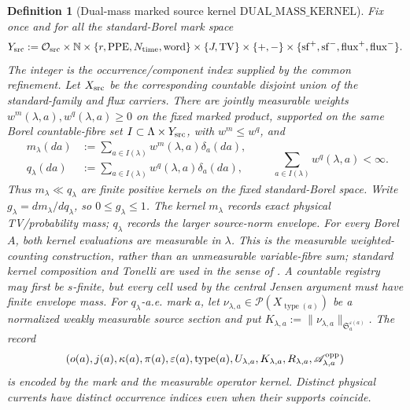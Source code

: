 \documentclass[11pt]{article}
\newtheorem{definition}[theorem]{Definition}
\begin{document}
\begin{definition}[Dual-mass marked source kernel
$\mathrm{DUAL\_MASS\_KERNEL}$]
\label{def:source-incidence-space}
Fix once and for all the standard-Borel mark space
\[
 Y_{\rm src}:=\mathcal O_{\rm src}\times\mathbb N\times
 \{r,\mathrm{PPE},N_{\rm time},\mathrm{word}\}\times
 \{J,\mathrm{TV}\}\times\{+,-\}\times
 \{\mathrm{sf}^+,\mathrm{sf}^-,\mathrm{flux}^+,\mathrm{flux}^-\}.
\]
The integer is the occurrence/component index supplied by the common
refinement.  Let $X_{\rm src}$ be the corresponding countable disjoint union
of the standard-family and flux carriers.  There are jointly measurable
weights $w^m(\lambda,a),w^q(\lambda,a)\ge0$ on the fixed marked product,
supported on the same Borel countable-fibre set
$I\subset\Lambda\times Y_{\rm src}$, with $w^m\le w^q$, and
\begin{equation}
\label{eq:marked-weighted-counting-kernel}
 \begin{aligned}
 m_\lambda(da)&:=\sum_{a\in I(\lambda)}w^m(\lambda,a)\delta_a(da),\\
 q_\lambda(da)&:=\sum_{a\in I(\lambda)}w^q(\lambda,a)\delta_a(da),
 \end{aligned}
 \qquad
 \sum_{a\in I(\lambda)}w^q(\lambda,a)<\infty.
\end{equation}
Thus $m_\lambda\ll q_\lambda$ are finite positive kernels on the fixed
standard-Borel space.  Write $g_\lambda=dm_\lambda/dq_\lambda$, so
$0\le g_\lambda\le1$.  The kernel $m_\lambda$ records exact physical
TV/probability mass; $q_\lambda$ records the larger source-norm envelope.
For every Borel $A$, both kernel evaluations are measurable in $\lambda$.
This is the measurable weighted-counting construction, rather than an
unmeasurable variable-fibre sum; standard kernel composition and Tonelli are
used in the sense of \cite{VakarOng}.  A countable registry may first be
$s$-finite, but every cell used by the central Jensen argument must have
finite envelope mass.  For $q_\lambda$-a.e. mark $a$, let
$\nu_{\lambda,a}\in\mathcal P(X_{\operatorname{type}(a)})$ be a normalized
weakly measurable source section and put
$K_{\lambda,a}:=\|\nu_{\lambda,a}\|_{\mathfrak S_a^{\varepsilon(a)}}$.
The record
\begin{equation}
\label{eq:source-incidence-record}
 (o(a),j(a),\kappa(a),\pi(a),\varepsilon(a),\operatorname{type}(a),
   U_{\lambda,a},K_{\lambda,a},R_{\lambda,a},
   \mathscr A_{\lambda,a}^{\rm opp})
\end{equation}
is encoded by the mark and the measurable operator kernel.  Distinct
physical currents have distinct occurrence indices even when their supports
coincide.


\end{definition}
\end{document}
